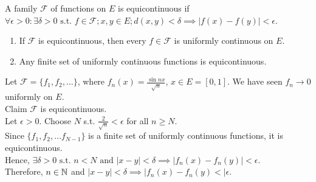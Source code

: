 \begin{define}[Equicontinuity]
	A family $\mathscr{F}$ of functions on $E$ is equicontinuous if $\forall{\epsilon > 0}: \exists{\delta > 0} \text{ s.t. } f \in  \mathscr{F}; x,y \in E; d(x,y)<\delta\implies  \left|f(x)-f(y)\right| < \epsilon$.
	\begin{remark}
		\begin{enumerate}
			\item If $\mathscr{F}$ is equicontinuous, then every ${f \in  \mathscr{F}}$ is uniformly continuous on $E$.
			\item Any finite set of uniformly continuous functions is equicontinuous.
		\end{enumerate}
	\end{remark}
	\begin{example}
		Let $\mathscr{F}=\{f_1,f_2,\ldots \}$, where $f_n(x)=\frac{\sin{nx}}{\sqrt{n}}$, $x \in E=[0,1]$. We have seen $f_n\to 0$ uniformly on $E$.\\
		Claim $\mathscr{F}$ is equicontinuous.\\
		Let $\epsilon>0$. Choose $N$ s.t. $\frac{2}{\sqrt{n}}<\epsilon$ for all $n\ge N$.\\
		Since $\{f_1,f_2,\ldots f_{N-1}\}$ is a finite set of uniformly continuous functions, it is equicontinuous.\\
		Hence, $\exists{\delta>0} \text{ s.t. } n<N \text{ and } \left|x-y\right| <\delta\implies \left|f_n(x)-f_n(y)\right| <\epsilon$.\\
		Therefore, $n \in \mathbb{N}$ and $\left|x-y\right| < \delta \implies \left|f_n(x)-f_n(y)<\right| \epsilon$.
	\end{example}
\end{define}

